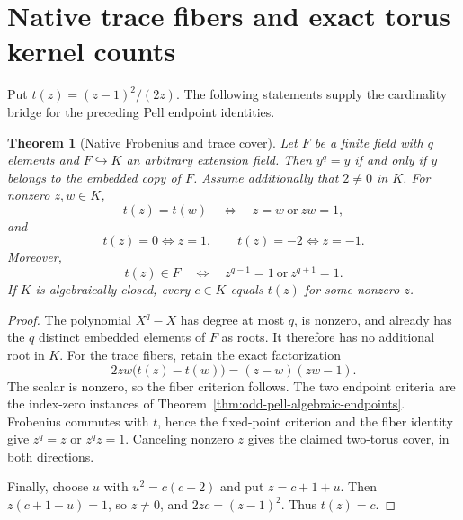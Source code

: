 \documentclass[11pt]{article}
\newtheorem{theorem}{Theorem}[section]
\begin{document}
\section{Native trace fibers and exact torus kernel counts}
\label{sec:odd-pell-trace-tori}
Put \(t(z)=(z-1)^2/(2z)\). The following statements supply the
cardinality bridge for the preceding Pell endpoint identities.

\begin{theorem}[Native Frobenius and trace cover]
\label{thm:odd-pell-native-trace-cover}
Let \(F\) be a finite field with \(q\) elements and \(F\hookrightarrow K\)
an arbitrary extension field. Then \(y^q=y\) if and only if \(y\) belongs
to the embedded copy of \(F\).
Assume additionally that \(2\ne0\) in \(K\). For nonzero \(z,w\in K\),
\[
 t(z)=t(w)\quad\Longleftrightarrow\quad z=w\ \text{or}\ zw=1,
\]
and
\[
 t(z)=0\Longleftrightarrow z=1,\qquad
 t(z)=-2\Longleftrightarrow z=-1.
\]
Moreover,
\[
 t(z)\in F\quad\Longleftrightarrow\quad
 z^{q-1}=1\ \text{or}\ z^{q+1}=1.
\]
If \(K\) is algebraically closed, every \(c\in K\) equals \(t(z)\)
for some nonzero \(z\).
\end{theorem}
\begin{proof}
The polynomial \(X^q-X\) has degree at most \(q\), is nonzero,
and already has the \(q\) distinct embedded elements of \(F\) as roots.
It therefore has no additional root in \(K\).
For the trace fibers, retain the exact factorization
\[
 2zw\bigl(t(z)-t(w)\bigr)=(z-w)(zw-1).
\]
The scalar is nonzero, so the fiber criterion follows. The two endpoint
criteria are the index-zero instances of
Theorem~\ref{thm:odd-pell-algebraic-endpoints}.
Frobenius commutes with \(t\), hence the fixed-point criterion and
the fiber identity give \(z^q=z\) or \(z^qz=1\).
Canceling nonzero \(z\) gives the claimed two-torus cover, in both directions.

Finally, choose \(u\) with \(u^2=c(c+2)\) and put \(z=c+1+u\).
Then \(z(c+1-u)=1\), so \(z\ne0\), and
\(2zc=(z-1)^2\). Thus \(t(z)=c\).
\end{proof}
\end{document}
